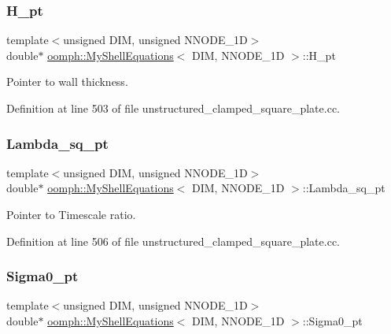 \subsubsection{\texorpdfstring{H\+\_\+pt}{H\_pt}}
{\footnotesize\ttfamily template$<$unsigned D\+IM, unsigned N\+N\+O\+D\+E\+\_\+1D$>$ \\
double$\ast$ \hyperlink{classoomph_1_1MyShellEquations}{oomph\+::\+My\+Shell\+Equations}$<$ D\+IM, N\+N\+O\+D\+E\+\_\+1D $>$\+::H\+\_\+pt\hspace{0.3cm}{\ttfamily [protected]}}



Pointer to wall thickness. 



Definition at line 503 of file unstructured\+\_\+clamped\+\_\+square\+\_\+plate.\+cc.

\mbox{\label{classoomph_1_1MyShellEquations_a6201b3eced8396c6e2246df94c946537}} 
\subsubsection{\texorpdfstring{Lambda\+\_\+sq\+\_\+pt}{Lambda\_sq\_pt}}
{\footnotesize\ttfamily template$<$unsigned D\+IM, unsigned N\+N\+O\+D\+E\+\_\+1D$>$ \\
double$\ast$ \hyperlink{classoomph_1_1MyShellEquations}{oomph\+::\+My\+Shell\+Equations}$<$ D\+IM, N\+N\+O\+D\+E\+\_\+1D $>$\+::Lambda\+\_\+sq\+\_\+pt\hspace{0.3cm}{\ttfamily [protected]}}



Pointer to Timescale ratio. 



Definition at line 506 of file unstructured\+\_\+clamped\+\_\+square\+\_\+plate.\+cc.

\mbox{\label{classoomph_1_1MyShellEquations_a909b1e9608109048d446f86ca3c7d02d}} 
\subsubsection{\texorpdfstring{Sigma0\+\_\+pt}{Sigma0\_pt}}
{\footnotesize\ttfamily template$<$unsigned D\+IM, unsigned N\+N\+O\+D\+E\+\_\+1D$>$ \\
double$\ast$ \hyperlink{classoomph_1_1MyShellEquations}{oomph\+::\+My\+Shell\+Equations}$<$ D\+IM, N\+N\+O\+D\+E\+\_\+1D $>$\+::Sigma0\+\_\+pt\hspace{0.3cm}{\ttfamily [protected]}}



